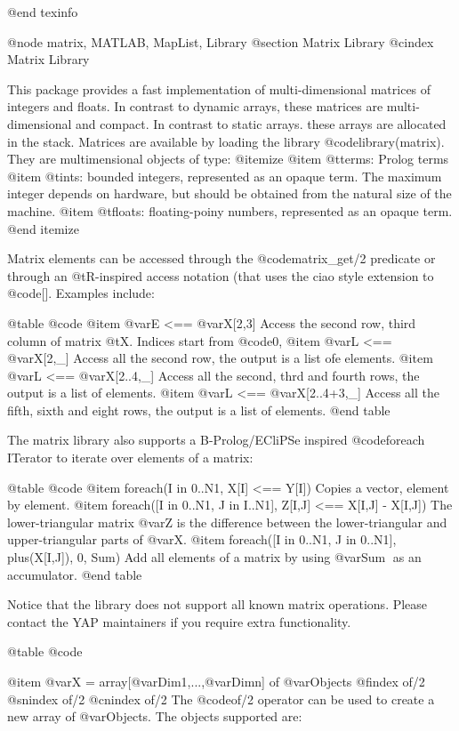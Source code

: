 @end texinfo


@node matrix, MATLAB, MapList, Library
@section Matrix Library
@cindex Matrix Library

This package provides a fast implementation of multi-dimensional
matrices of integers and floats. In contrast to dynamic arrays, these
matrices are multi-dimensional and compact. In contrast to static
arrays. these arrays are allocated in the stack. Matrices are available
by loading the library @code{library(matrix)}. They are multimensional
objects of type:
@itemize 
@item @t{terms}: Prolog terms
@item  @t{ints}: bounded integers, represented as an opaque term. The
maximum integer depends on hardware, but should be obtained from the
natural size of the machine.
@item  @t{floats}: floating-poiny numbers, represented as an opaque term.
@end itemize

Matrix elements can be accessed through the @code{matrix_get/2}
predicate or through an @t{R}-inspired access notation (that uses the ciao
style extension to @code{[]}.  Examples include:

@table @code
@item @var{E} <== @var{X}[2,3]
Access the second row, third column of matrix @t{X}. Indices start from
@code{0},
@item @var{L} <== @var{X}[2,_]
Access all the second row, the output is a list ofe elements.
@item @var{L} <== @var{X}[2..4,_]
Access all the second, thrd and fourth rows, the output is a list of elements.
@item @var{L} <== @var{X}[2..4+3,_]
Access all the fifth, sixth and eight rows, the output is a list of elements.
@end table

The matrix library also supports a B-Prolog/ECliPSe inspired @code{foreach} ITerator to iterate over
elements of a matrix:

@table @code
@item foreach(I in 0..N1, X[I] <== Y[I])
Copies a vector, element by element.
@item foreach([I in 0..N1, J in I..N1], Z[I,J] <== X[I,J] - X[I,J])
The lower-triangular matrix @var{Z} is the difference between the
lower-triangular and upper-triangular parts of @var{X}.
@item foreach([I in 0..N1, J in 0..N1], plus(X[I,J]), 0, Sum)
Add all elements of a matrix by using @var{Sum} as an accumulator.
@end table

Notice that the library does not support all known matrix operations. Please
contact the YAP maintainers if you require extra functionality.

@table @code

@item @var{X} = array[@var{Dim1},...,@var{Dimn}] of @var{Objects}
@findex of/2
@snindex of/2
@cnindex of/2
The @code{of/2} operator can be used to create a new array of
@var{Objects}. The objects supported are:

